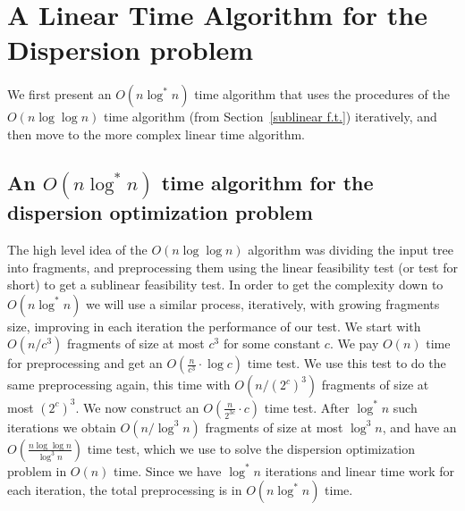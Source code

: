 \documentclass[11pt,a4paper]{article}
\theoremstyle{definition}
\theoremstyle{remark}
\begin{document}
\section{A Linear Time Algorithm for the Dispersion problem}\label{linear algorithm for the dispersion optimization problem}

We first present an $O(n \log^* n)$ time algorithm that uses the procedures of the $O(n \log \log n)$ time algorithm (from Section~\ref{sublinear f.t.}) iteratively, and then move to the more complex linear time algorithm.

\subsection{An \texorpdfstring{\boldmath$O(n\log^{*}n)$}{O(nlog^*n)} time algorithm for the dispersion optimization problem} \label{sectionlog*}
The high level idea of the $O(n \log \log n)$ algorithm was dividing the input tree into fragments, and preprocessing them using the linear feasibility test (or test for short) to get a sublinear feasibility test. In order to get the complexity down to $O(n \log ^*n)$ we will use a similar process, iteratively, with growing fragments size, improving in each iteration the performance of our test.
We start with $O(n/c^{3})$ fragments of size at most $c^3$ for some constant $c$.
We pay $O(n)$ time for preprocessing and get an $O(\frac{n}{c^3} \cdot \log c)$ time test.
We use this test to do the same preprocessing again, this time with $O(n/(2^{c})^{3})$ fragments of size at most $(2^c)^3$.
We now construct an $O(\frac{n}{2^{3c}} \cdot c)$ time test.
After $\log ^*n$ such iterations we obtain $O(n/\log^{3}n)$ fragments of size at most $\log ^3n$, and have
an $O(\frac{n \log \log n}{\log ^3n})$ time test, which we use to solve the dispersion optimization problem in $O(n)$ time. Since we have $\log ^*n$ iterations and linear time work for each
iteration, the total preprocessing is in $O(n \log ^*n)$ time.
\end{document}

